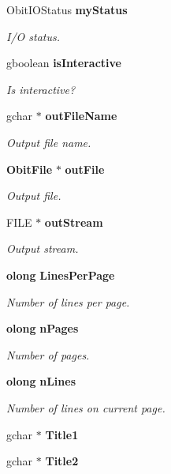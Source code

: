 \begin{CompactItemize}
Obit\-IOStatus {\bf my\-Status}
\begin{CompactList}\small\item\em I/O status. \item\end{CompactList}\item 
gboolean {\bf is\-Interactive}
\begin{CompactList}\small\item\em Is interactive? \item\end{CompactList}\item 
gchar $\ast$ {\bf out\-File\-Name}
\begin{CompactList}\small\item\em Output file name. \item\end{CompactList}\item 
{\bf Obit\-File} $\ast$ {\bf out\-File}
\begin{CompactList}\small\item\em Output file. \item\end{CompactList}\item 
FILE $\ast$ {\bf out\-Stream}
\begin{CompactList}\small\item\em Output stream. \item\end{CompactList}\item 
{\bf olong} {\bf Lines\-Per\-Page}
\begin{CompactList}\small\item\em Number of lines per page. \item\end{CompactList}\item 
{\bf olong} {\bf n\-Pages}
\begin{CompactList}\small\item\em Number of pages. \item\end{CompactList}\item 
{\bf olong} {\bf n\-Lines}
\begin{CompactList}\small\item\em Number of lines on current page. \item\end{CompactList}\item 
gchar $\ast$ {\bf Title1}
\item 
gchar $\ast$ {\bf Title2}
\end{CompactItemize}


